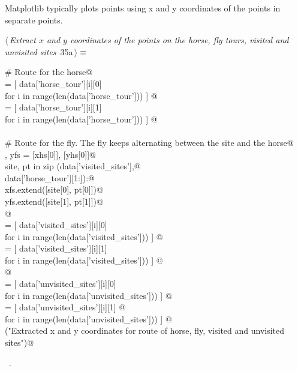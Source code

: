 \documentclass[11.5pt]{report}
\begin{document}
\vspace{-0.8cm}\newchunk Matplotlib typically plots points using x and y coordinates of the points in separate points. 

\begin{flushleft} \small\label{scrap40}\raggedright\small
{} $\langle\,${\itshape Extract $x$ and $y$ coordinates of the points on the horse, fly tours, visited and unvisited sites}\nobreak\ {\footnotesize {35a}}$\,\rangle\equiv$
\vspace{-1ex}
\begin{list}{}{} \item
\mbox{}\verb@# Route for the horse@\\
\mbox{}\verb@xhs = [ data['horse_tour'][i][0] \@\\
\mbox{}\verb@          for i in range(len(data['horse_tour']))  ]    @\\
\mbox{}\verb@yhs = [ data['horse_tour'][i][1] \@\\
\mbox{}\verb@          for i in range(len(data['horse_tour']))  ]    @\\
\mbox{}\verb@@\\
\mbox{}\verb@# Route for the fly. The fly keeps alternating between the site and the horse@\\
\mbox{}\verb@xfs , yfs = [xhs[0]], [yhs[0]]@\\
\mbox{}\verb@for site, pt in zip (data['visited_sites'],@\\
\mbox{}\verb@                     data['horse_tour'][1:]):@\\
\mbox{}\verb@    xfs.extend([site[0], pt[0]])@\\
\mbox{}\verb@    yfs.extend([site[1], pt[1]])@\\
\mbox{}\verb@        @\\
\mbox{}\verb@xvisited = [ data['visited_sites'][i][0] \@\\
\mbox{}\verb@               for i in range(len(data['visited_sites']))  ]    @\\
\mbox{}\verb@yvisited = [ data['visited_sites'][i][1] \@\\
\mbox{}\verb@               for i in range(len(data['visited_sites']))  ]    @\\
\mbox{}\verb@    @\\
\mbox{}\verb@xunvisited = [ data['unvisited_sites'][i][0] \@\\
\mbox{}\verb@                 for i in range(len(data['unvisited_sites']))  ]    @\\
\mbox{}\verb@yunvisited = [ data['unvisited_sites'][i][1] @\\
\mbox{}\verb@                 for i in range(len(data['unvisited_sites'])) ]    @\\
\mbox{}\verb@debug("Extracted x and y coordinates for route of horse, fly, visited and unvisited sites")@\\
\mbox{}\verb@@{\NWsep}
\end{list}
\vspace{-1.5ex}
\footnotesize
\begin{list}{}{\setlength{\itemsep}{-\parsep}\setlength{\itemindent}{-\leftmargin}}
\item \NWtxtMacroRefIn\ .


\end{list}
\end{flushleft}
\end{document}
